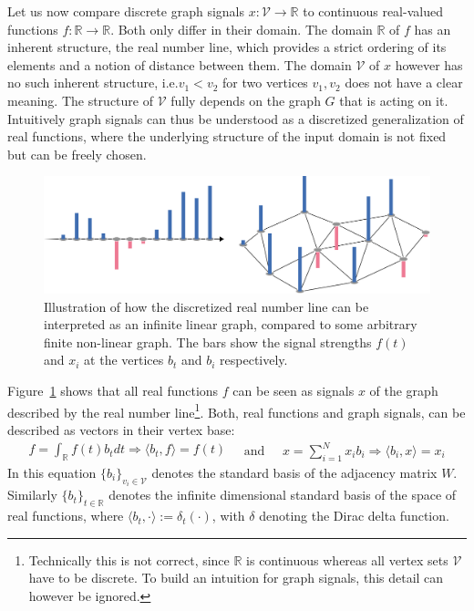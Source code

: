 Let us now compare discrete graph signals $x: \mathcal{V} \to \mathbb{R}$ to continuous real-valued functions $f: \mathbb{R} \to \mathbb{R}$.
Both only differ in their domain.
The domain $\mathbb{R}$ of $f$ has an inherent structure, the real number line, which provides a strict ordering of its elements and a notion of distance between them.
The domain $\mathcal{V}$ of $x$ however has no such inherent structure, i.e.\@ $v_1 < v_2$ for two vertices $v_1, v_2$ does not have a clear meaning.
The structure of $\mathcal{V}$ fully depends on the graph $G$ that is acting on it.
Intuitively graph signals can thus be understood as a discretized generalization of real functions, where the underlying structure of the input domain is not fixed but can be freely chosen.
\begin{figure}
	\centering
	\includegraphics[width=0.9\linewidth]{gfx/sgt/real-graph.pdf}
	\caption{
		Illustration of how the discretized real number line can be interpreted as an infinite linear graph, compared to some arbitrary finite non-linear graph.
		The bars show the signal strengths $f(t)$ and $x_i$ at the vertices $b_t$ and $b_i$ respectively.
	}\label{fig:sgt:realGraph}
\end{figure}
Figure~\ref{fig:sgt:realGraph} shows that all real functions $f$ can be seen as signals $x$ of the graph described by the real number line\footnote{
	Technically this is not correct, since $\mathbb{R}$ is continuous whereas all vertex sets $\mathcal{V}$ have to be discrete.
	To build an intuition for graph signals, this detail can however be ignored.
}.
Both, real functions and graph signals, can be described as vectors in their vertex base:
\begin{equation}
	\begin{split}
		f = \int_{\mathbb{R}} f(t) b_t dt
		\Rightarrow \langle b_t, f \rangle = f(t)
	\end{split}
	\quad\text{and}\quad
	\begin{split}
		x = \sum_{i = 1}^{N} x_i b_i
		\Rightarrow \langle b_i, x \rangle = x_i
	\end{split}
\end{equation}
In this equation ${\{ b_i \}}_{v_i \in \mathcal{V}}$ denotes the standard basis of the adjacency matrix $W$.
Similarly ${\{ b_t \}}_{t \in \mathbb{R}}$ denotes the infinite dimensional standard basis of the space of real functions, where $\langle b_t, \cdot \rangle := \delta_t(\cdot)$, with $\delta$ denoting the Dirac delta function.

